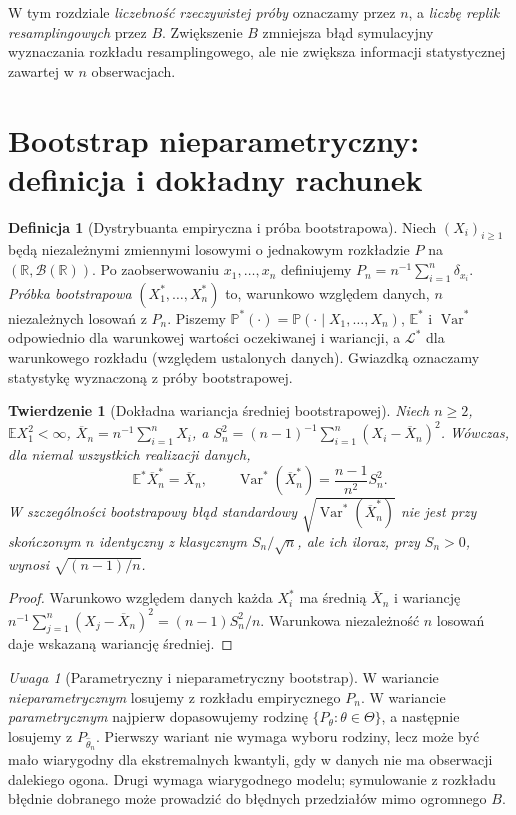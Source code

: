\documentclass[11pt,a4paper,oneside]{report}
\numberwithin{equation}{chapter}
\theoremstyle{plain}
\newtheorem{twierdzenie}{Twierdzenie}[chapter]
\theoremstyle{definition}
\newtheorem{definicja}{Definicja}[chapter]
\theoremstyle{remark}
\newtheorem{uwaga}{Uwaga}[chapter]
\newcommand{\R}{\mathbb R}
\newcommand{\Prob}{\mathbb P}
\newcommand{\E}{\mathbb E}
\newcommand{\Var}{\operatorname{Var}}
\begin{document}
W tym rozdziale \emph{liczebność rzeczywistej próby} oznaczamy przez $n$,
a \emph{liczbę replik resamplingowych} przez $B$. Zwiększenie $B$
zmniejsza błąd symulacyjny wyznaczania rozkładu resamplingowego,
ale nie zwiększa informacji statystycznej zawartej w $n$ obserwacjach.

\section{Bootstrap nieparametryczny: definicja i dokładny rachunek}
\begin{definicja}[Dystrybuanta empiryczna i próba bootstrapowa]
\label{def:bootstrap-sample}
Niech $(X_i)_{i\ge1}$ będą niezależnymi zmiennymi losowymi
o jednakowym rozkładzie $P$ na $(\R,\mathcal B(\R))$.
Po zaobserwowaniu $x_1,\ldots,x_n$ definiujemy
$P_n=n^{-1}\sum_{i=1}^n\delta_{x_i}$.
\emph{Próbka bootstrapowa} $(X_1^*,\ldots,X_n^*)$ to,
warunkowo względem danych, $n$ niezależnych losowań z $P_n$.
Piszemy $\Prob^*(\cdot)=\Prob(\cdot\mid X_1,\ldots,X_n)$,
$\E^*$ i $\Var^*$ odpowiednio dla warunkowej wartości
oczekiwanej i wariancji, a $\mathcal L^*$ dla warunkowego
rozkładu (względem ustalonych danych). Gwiazdką oznaczamy statystykę
wyznaczoną z próby bootstrapowej.
\end{definicja}

\begin{twierdzenie}[Dokładna wariancja średniej bootstrapowej]
\label{thm:bootstrap-mean-variance}
Niech $n\ge2$, $\E X_1^2<\infty$,
$\overline X_n=n^{-1}\sum_{i=1}^nX_i$, a
$S_n^2=(n-1)^{-1}\sum_{i=1}^n(X_i-\overline X_n)^2$.
Wówczas, dla niemal wszystkich realizacji danych,
\[
 \E^*\overline X_n^*=\overline X_n,\qquad
 \Var^*(\overline X_n^*)=\frac{n-1}{n^2}S_n^2.
\]
W szczególności bootstrapowy błąd standardowy $\sqrt{\Var^*(\overline X_n^*)}$
nie jest przy skończonym $n$ identyczny z klasycznym $S_n/\sqrt n$,
ale ich iloraz, przy $S_n>0$, wynosi $\sqrt{(n-1)/n}$.
\end{twierdzenie}
\begin{proof}
Warunkowo względem danych każda $X_i^*$ ma średnią
$\overline X_n$ i wariancję
$n^{-1}\sum_{j=1}^n(X_j-\overline X_n)^2=(n-1)S_n^2/n$.
Warunkowa niezależność $n$ losowań daje wskazaną wariancję średniej.
\end{proof}

\begin{uwaga}[Parametryczny i nieparametryczny bootstrap]
W wariancie \emph{nieparametrycznym} losujemy z rozkładu empirycznego $P_n$.
W wariancie \emph{parametrycznym} najpierw dopasowujemy rodzinę
$\{P_\theta:\theta\in\Theta\}$, a następnie losujemy z
$P_{\widehat\theta_n}$. Pierwszy wariant nie wymaga wyboru rodziny,
lecz może być mało wiarygodny dla ekstremalnych kwantyli,
gdy w danych nie ma obserwacji dalekiego ogona. Drugi wymaga
wiarygodnego modelu; symulowanie z rozkładu błędnie dobranego
może prowadzić do błędnych przedziałów mimo ogromnego $B$.
\end{uwaga}
\end{document}
